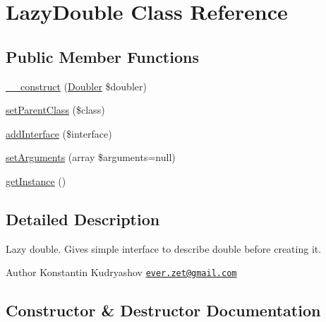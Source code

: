 \hypertarget{class_prophecy_1_1_doubler_1_1_lazy_double}{}\section{Lazy\+Double Class Reference}
\label{class_prophecy_1_1_doubler_1_1_lazy_double}
\subsection*{Public Member Functions}
\begin{DoxyCompactItemize}
\item 
\mbox{\hyperlink{class_prophecy_1_1_doubler_1_1_lazy_double_a8e491234072b12a2eafa143624a9769b}{\+\_\+\+\_\+construct}} (\mbox{\hyperlink{class_prophecy_1_1_doubler_1_1_doubler}{Doubler}} \$doubler)
\item 
\mbox{\hyperlink{class_prophecy_1_1_doubler_1_1_lazy_double_a36c45e1400b3e0404a90bfa058ef8019}{set\+Parent\+Class}} (\$class)
\item 
\mbox{\hyperlink{class_prophecy_1_1_doubler_1_1_lazy_double_a8ee340e93f5c12065057df00a3b37e3a}{add\+Interface}} (\$interface)
\item 
\mbox{\hyperlink{class_prophecy_1_1_doubler_1_1_lazy_double_a5398ebf107a0f0c136b0d134714b13ff}{set\+Arguments}} (array \$arguments=null)
\item 
\mbox{\hyperlink{class_prophecy_1_1_doubler_1_1_lazy_double_afba86dd08ac8528cc6cfe07a44c91fbe}{get\+Instance}} ()
\end{DoxyCompactItemize}


\subsection{Detailed Description}
Lazy double. Gives simple interface to describe double before creating it.

\begin{DoxyAuthor}{Author}
Konstantin Kudryashov \href{mailto:ever.zet@gmail.com}{\tt ever.\+zet@gmail.\+com} 
\end{DoxyAuthor}


\subsection{Constructor \& Destructor Documentation}
\mbox{\label{class_prophecy_1_1_doubler_1_1_lazy_double_a8e491234072b12a2eafa143624a9769b}} 
